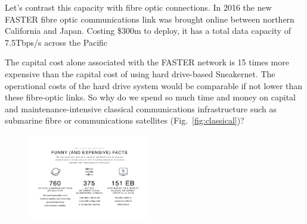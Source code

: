\documentclass[twocolumn, aps, rmp, amsmath, amssymb, nofootinbib, superscriptaddress, longbibliography, floatfix, table-of-contents, eqsecnum]{revtex4-2}
\begin{document}
Let's contrast this capacity with fibre optic connections. In 2016 the new FASTER fibre optic communications link was brought online between northern California and Japan. Costing \$300m to deploy, it has a total data capacity of 7.5Tbps/s across the Pacific %

The capital cost alone associated with the FASTER network is 15 times more expensive than the capital cost of using hard drive-based Sneakernet. The operational costs of the hard drive system would be comparable if not lower than these fibre-optic links. So why do we spend so much time and money on capital and maintenance-intensive classical communications infrastructure such as submarine fibre or communications satellites (Fig.~\ref{fig:classical})?

\begin{figure}[htbp!]
	\includegraphics[clip=true, width=0.475\textwidth]{classical}
\end{figure}
\end{document}
